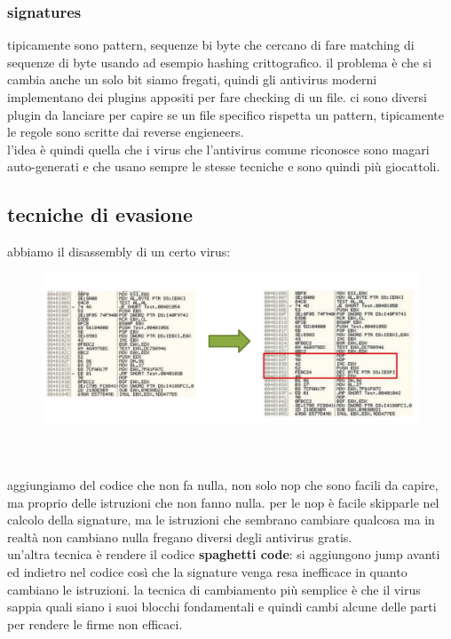 \documentclass[12pt, oneside]{extbook} %
\begin{document}
\subsubsection{signatures}
tipicamente sono pattern, sequenze bi byte che cercano di fare matching di sequenze di byte usando ad esempio hashing crittografico. il problema è che si cambia anche un solo bit siamo fregati, quindi gli antivirus moderni implementano dei plugins appositi per fare checking di un file. ci sono diversi plugin da lanciare per capire se un file specifico rispetta un pattern, tipicamente le regole sono scritte dai reverse engieneers.\\l'idea è quindi quella che i virus che l'antivirus comune riconosce sono magari auto-generati e che usano sempre le stesse tecniche e sono quindi più giocattoli.

\subsection{tecniche di evasione}
abbiamo il disassembly di un certo virus:\\
\begin{figure}[!h]
	\includegraphics[scale=0.3]{immagini/poly_code.png}
\end{figure}\\\\
aggiungiamo del codice che non fa nulla, non solo nop che sono facili da capire, ma proprio delle istruzioni che non fanno nulla. per le nop è facile skipparle nel calcolo della signature, ma le istruzioni che sembrano cambiare qualcosa ma in realtà non cambiano nulla fregano diversi degli antivirus gratis.\\un'altra tecnica è rendere il codice \textbf{\textsf{spaghetti code}}: si aggiungono jump avanti ed indietro nel codice così che la signature venga resa inefficace in quanto cambiano le istruzioni. la tecnica di cambiamento più semplice è che il virus sappia quali siano i suoi blocchi fondamentali e quindi cambi alcune delle parti per rendere le firme non efficaci.
\end{document}

